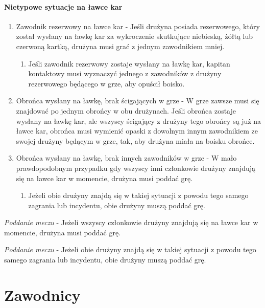 \documentclass[12pt]{article}
\begin{document}
\paragraph{Nietypowe sytuacje na ławce kar}

\begin{enumerate}
	\item
	      Zawodnik rezerwowy na ławce kar - Jeśli drużyna posiada rezerwowego,
	      który został wysłany na ławkę kar za wykroczenie skutkujące niebieską,
	      żółtą lub czerwoną kartką, drużyna musi grać z jednym zawodnikiem
	      mniej.

	      \begin{enumerate}
		      \item
		            Jeśli zawodnik rezerwowy zostaje wysłany na ławkę kar, kapitan
		            kontaktowy musi wyznaczyć jednego z zawodników z drużyny rezerwowego
		            będącego w grze, aby opuścił boisko.
	      \end{enumerate}
	\item
	      Obrońca wysłany na ławkę, brak ścigających w grze - W grze zawsze musi
	      się znajdować po jednym obrońcy w obu drużynach. Jeśli obrońca zostaje
	      wysłany na ławkę kar, ale wszyscy ścigający z drużyny tego obrońcy są
	      już na ławce kar, obrońca musi wymienić opaski z dowolnym innym
	      zawodnikiem ze swojej drużyny będącym w grze, tak, aby drużyna miała
	      na boisku obrońce.
	\item
	      Obrońca wysłany na ławkę, brak innych zawodników w grze - W mało
	      prawdopodobnym przypadku gdy wszyscy inni członkowie drużyny znajdują
	      się na ławce kar w momencie, drużyna musi poddać grę.

	      \begin{enumerate}
		      \item
		            Jeżeli obie drużyny znajdą się w takiej sytuacji z powodu tego
		            samego zagrania lub incydentu, obie drużyny muszą poddać grę.
	      \end{enumerate}
\end{enumerate}

\emph{Poddanie meczu} - Jeżeli wszyscy członkowie drużyny znajdują się
na ławce kar w momencie, drużyna musi poddać grę.

\emph{Poddanie meczu} - Jeżeli obie drużyny znajdą się w takiej sytuacji
z powodu tego samego zagrania lub incydentu, obie drużyny muszą poddać
grę.


\pagebreak
\section{Zawodnicy}
\end{document}
